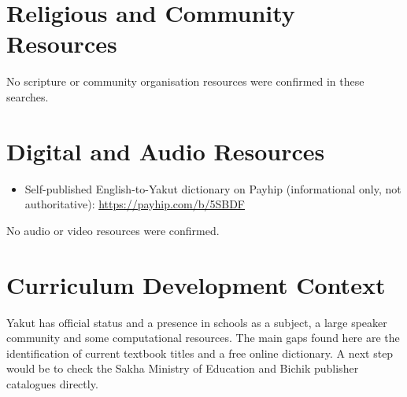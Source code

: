 \documentclass[12pt]{article}
\begin{document}
\section{Religious and Community Resources}
No scripture or community organisation resources were confirmed in these searches.

\section{Digital and Audio Resources}
\begin{itemize}
\item Self-published English-to-Yakut dictionary on Payhip (informational only, not authoritative): \url{https://payhip.com/b/5SBDF}
\end{itemize}
No audio or video resources were confirmed.

\section{Curriculum Development Context}
Yakut has official status and a presence in schools as a subject, a large speaker community and some computational resources. The main gaps found here are the identification of current textbook titles and a free online dictionary. A next step would be to check the Sakha Ministry of Education and Bichik publisher catalogues directly.
\end{document}
